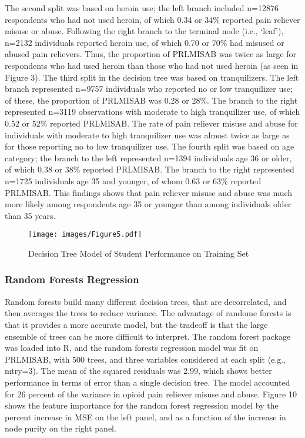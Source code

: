 \documentclass[sigconf]{acmart}
\begin{document}

The second split was based on heroin use; the left branch included n=12876 
respondents who had not used heroin, of which 0.34 or 34\% reported pain
reliever misuse or abuse. Following the right branch to the terminal node 
(i.e., `leaf'), n=2132 individuals reported heroin use, of which 0.70 or 
70\% had misused or abused pain relievers. Thus, the proportion of PRLMISAB 
was twice as large for respondents who had used heroin than those who had 
not used heroin (as seen in Figure 3). The third split in the decision tree
was based on tranquilizers. The left branch represented n=9757 individuals 
who reported no or low tranquilizer use; of these, the proportion of 
PRLMISAB was 0.28 or 28\%. The branch to the right represented n=3119 
observations with moderate to high tranquilizer use, of which 0.52 or 52\% 
reported PRLMISAB. The rate of pain reliever misuse and abuse for individuals 
with moderate to high tranquilizer use was almost twice as large as for 
those reporting no to low tranquilizer use. The fourth split was based on age 
category; the branch to the left represented n=1394 individuals age 36 or older, 
of which 0.38 or 38\% reported PRLMISAB. The branch to the right represented 
n=1725 individuals age 35 and younger, of whom 0.63 or 63\% reported PRLMISAB. 
This findings shows that pain reliever misuse and abuse was much more likely
among respondents age 35 or younger than among individuals older than 35 years. 

\begin{figure}[!ht]
  \centering\texttt{[image: images/Figure5.pdf]}
  \caption{Decision Tree Model of Student Performance on Training Set}
  \label{f:Figure5}
\end{figure}


\subsubsection{Random Forests Regression}

Random forests build many different decision trees, that are decorrelated, and 
then averages the trees to reduce variance. The advantage of randome forests is 
that it provides a more accurate model, but the tradeoff is that the large 
ensemble of trees can be more difficult to interpret. The random forest package 
was loaded into R, and the random forests regression model was fit on PRLMISAB, 
with 500 trees, and three variables considered at each split (e.g., mtry=3).
The mean of the squared residuals was 2.99, which shows better performance
in terms of error than a single decision tree. The model accounted for 26
percent of the variance in opioid pain reliever misuse and abuse. Figure 10
shows the feature importance for the random forest regression model by the
percent increase in MSE on the left panel, and as a function of the increase
in node purity on the right panel. 
\end{document}
